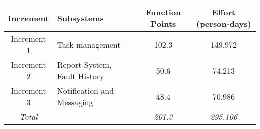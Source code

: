 
\begin{tabular}{c|l|c|c}
\textbf{Increment} & \textbf{Subsystems} & \textbf{Function Points} & \textbf{Effort (person-days)} \\ \hline
Increment 1 & Task management & 102.3 & 149.972 \\
Increment 2 & Report System, Fault History & 50.6 & 74.213 \\
Increment 3 & Notification and Messaging & 48.4 & 70.986 \\ \hline
\textit{Total} &  & \textit{201.3} & \textit{295.106} \\
\end{tabular}

